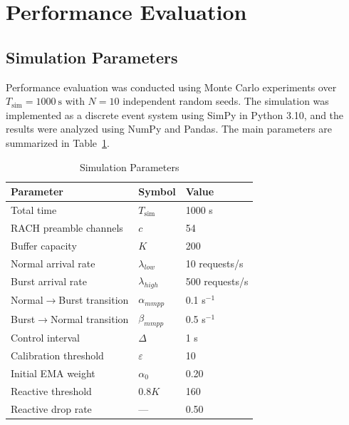\documentclass[conference]{IEEEtran}
\begin{document}
\section{Performance Evaluation}

\subsection{Simulation Parameters}

Performance evaluation was conducted using Monte Carlo experiments over $T_{\mathrm{sim}} = 1000\ \mathrm{s}$ with $N = 10$ independent random seeds. The simulation was implemented as a discrete event system using SimPy in Python 3.10, and the results were analyzed using NumPy and Pandas. The main parameters are summarized in Table~\ref{tab:params}.

\begin{table}[t]
\caption{Simulation Parameters}
\label{tab:params}
\begin{center}
\begin{tabular}{lll}
\toprule
\textbf{Parameter} & \textbf{Symbol} & \textbf{Value} \\
\midrule
Total time                  & $T_{\mathrm{sim}}$ & 1000 s \\
RACH preamble channels      & $c$                & 54 \\
Buffer capacity             & $K$                & 200 \\
Normal arrival rate         & $\lambda_{low}$   & 10 requests/s \\
Burst arrival rate          & $\lambda_{high}$  & 500 requests/s \\
Normal$\to$Burst transition & $\alpha_{mmpp}$   & 0.1 s$^{-1}$ \\
Burst$\to$Normal transition & $\beta_{mmpp}$    & 0.5 s$^{-1}$ \\
Control interval            & $\Delta$          & 1 s \\
Calibration threshold       & $\varepsilon$     & 10 \\
Initial EMA weight          & $\alpha_0$        & 0.20 \\
Reactive threshold          & $0.8K$             & 160 \\
Reactive drop rate          & ---                & 0.50 \\
\bottomrule
\end{tabular}
\end{center}
\end{table}
\end{document}
